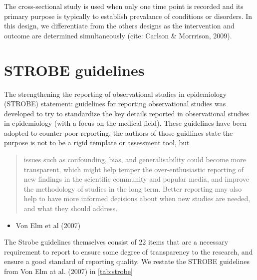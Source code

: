 \documentclass[]{book}
\providecommand{\tightlist}{%
  \setlength{\itemsep}{0pt}\setlength{\parskip}{0pt}}
\begin{document}
The cross-sectional study is used when only one time point is recorded and its primary purpose is typically to establish prevalance of conditions or disorders. In this design, we differentiate from the others designs as the intervention and outcome are determined simultaneously (cite: Carlson \& Morrrison, 2009).

\hypertarget{strobe-guidelines}{%
\section{STROBE guidelines}\label{strobe-guidelines}}

The strengthening the reporting of observational studies in epidemiology (STROBE) statement: guidelines for reporting observational studies was developed to try to standardize the key details reported in observational studies in epidemiology (with a focus on the medical field). These guidelines have been adopted to counter poor reporting, the authors of those guidlines state the purpose is not to be a rigid template or assessment tool, but

\begin{quote}
issues such as confounding, bias, and generalisability could become more transparent, which might help temper the over-enthusiastic reporting of new findings in the scientific community and popular media, and improve the methodology of studies in the long term. Better reporting may also help to have more informed decisions about when new studies are needed, and what they should address.
\end{quote}

\begin{itemize}
\tightlist
\item
  Von Elm et al (2007)
\end{itemize}

The Strobe guidelines themselves consist of 22 items that are a necessary requirement to report to ensure some degree of transparency to the research, and ensure a good standard of reporting quality. We restate the STROBE guidelines from Von Elm at al. (2007) in \ref{tab:strobe}
\end{document}
